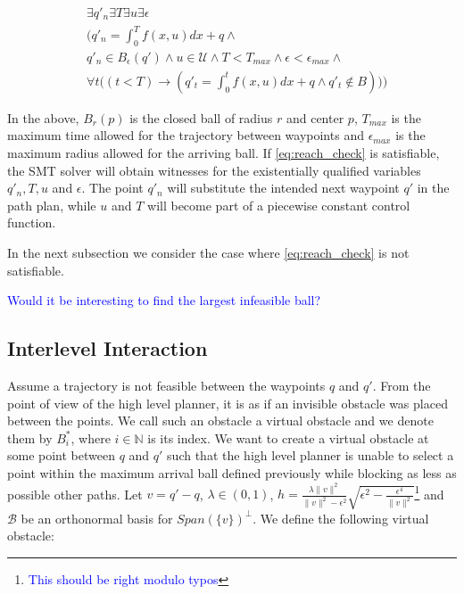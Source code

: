 \documentclass[12pt]{article}
\newcommand\fran[1]{\textcolor{blue}{#1}}
\newcommand\ffran[1]{\textcolor{blue}{\footnote{\fran{#1}}}}
\begin{document}
\begin{equation}
    \label{eq:reach_check}
    \begin{split}
        &\exists q'_n \exists T \exists u \exists \epsilon \\
        &\bigg(
            q'_n = \int_{0}^{T} f(x, u) dx + q \land \\
        &q'_n \in B_{\epsilon}(q') \land 
            u \in \mathcal{U} \land
            T < T_{max} \land
            \epsilon < \epsilon_{max} \land \\
        &\forall t \Big((t < T) \rightarrow 
            (q'_t = \int_{0}^{t} f(x, u) dx + q \land 
            q'_t \notin B )\Big)
        \bigg)
    \end{split}
\end{equation}

In the above, $B_r(p)$ is the closed ball of radius $r$ and center $p$, $T_{max}$ is the maximum time allowed for the trajectory between waypoints and $\epsilon_{max}$ is the maximum radius allowed for the arriving ball. If \ref{eq:reach_check} is satisfiable, the SMT solver will obtain witnesses for the existentially qualified variables $q'_n, T, u$ and $\epsilon$. The point $q'_n$ will substitute the intended next waypoint $q'$ in the path plan, while $u$ and $T$ will become part of a piecewise constant control function.

In the next subsection we consider the case where \ref{eq:reach_check} is not satisfiable.

\fran{Would it be interesting to find the largest infeasible ball?}

\subsection{Interlevel Interaction}
\label{sub:interlevel_interaction}

Assume a trajectory is not feasible between the waypoints $q$ and $q'$. From the point of view of the high level planner, it is as if an invisible obstacle was placed between the points. We call such an obstacle a virtual obstacle and we denote them by $B^*_i$, where $i \in \mathbb{N}$ is its index. We want to create a virtual obstacle at some point between $q$ and $q'$ such that the high level planner is unable to select a point within the maximum arrival ball defined previously while blocking as less as possible other paths. Let $v = q' - q$, $\lambda \in (0, 1)$, $h = \frac{\lambda \|v\|^2}{\|v\|^2 - \epsilon^2} \sqrt{\epsilon^2 - \frac{\epsilon^4}{\|v\|^2}}$\ffran{This should be right modulo typos} and $\mathcal{B}$ be an orthonormal basis for $Span(\{v\})^{\bot}$. We define the following virtual obstacle:
\end{document}
